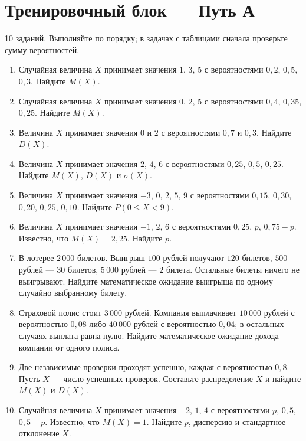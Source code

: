 \documentclass[a4paper,12pt]{article}
\begin{document}
\section*{Тренировочный блок --- Путь А}
\textcolor{muted}{10 заданий. Выполняйте по порядку; в задачах с таблицами сначала проверьте сумму вероятностей.}
\begin{enumerate}
\item Случайная величина $X$ принимает значения $1$, $3$, $5$ с вероятностями $0{,}2$, $0{,}5$, $0{,}3$. Найдите $M(X)$.
\item Случайная величина $X$ принимает значения $0$, $2$, $5$ с вероятностями $0{,}4$, $0{,}35$, $0{,}25$. Найдите $M(X)$.
\item Величина $X$ принимает значения $0$ и $2$ с вероятностями $0{,}7$ и $0{,}3$. Найдите $D(X)$.
\item Величина $X$ принимает значения $2$, $4$, $6$ с вероятностями $0{,}25$, $0{,}5$, $0{,}25$. Найдите $M(X)$, $D(X)$ и $\sigma(X)$.
\item Величина $X$ принимает значения $-3$, $0$, $2$, $5$, $9$ с вероятностями $0{,}15$, $0{,}30$, $0{,}20$, $0{,}25$, $0{,}10$. Найдите $P(0\le X<9)$.
\item Величина $X$ принимает значения $-1$, $2$, $6$ с вероятностями $0{,}25$, $p$, $0{,}75-p$. Известно, что $M(X)=2{,}25$. Найдите $p$.
\item В лотерее $2\,000$ билетов. Выигрыш $100$ рублей получают $120$ билетов, $500$ рублей --- $30$ билетов, $5\,000$ рублей --- $2$ билета. Остальные билеты ничего не выигрывают. Найдите математическое ожидание выигрыша по одному случайно выбранному билету.
\item Страховой полис стоит $3\,000$ рублей. Компания выплачивает $10\,000$ рублей с вероятностью $0{,}08$ либо $40\,000$ рублей с вероятностью $0{,}04$; в остальных случаях выплата равна нулю. Найдите математическое ожидание дохода компании от одного полиса.
\item Две независимые проверки проходят успешно, каждая с вероятностью $0{,}8$. Пусть $X$ --- число успешных проверок. Составьте распределение $X$ и найдите $M(X)$ и $D(X)$.
\item Случайная величина $X$ принимает значения $-2$, $1$, $4$ с вероятностями $p$, $0{,}5$, $0{,}5-p$. Известно, что $M(X)=1$. Найдите $p$, дисперсию и стандартное отклонение $X$.
\end{enumerate}
\clearpage
\end{document}
